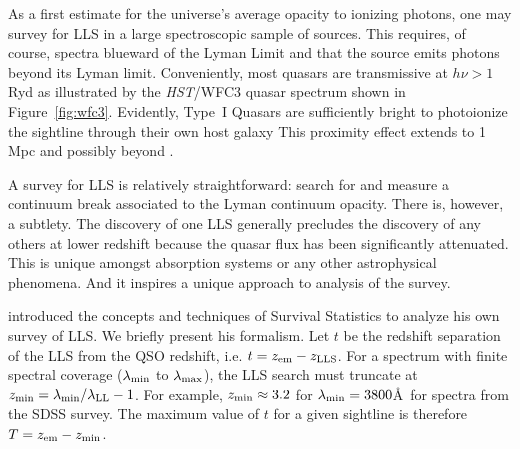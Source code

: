 \documentclass[graybox]{svmult}
\begin{document}
As a first estimate for the universe's average opacity to ionizing
photons, one may survey for LLS in a large spectroscopic
sample of sources.  This requires, of course, 
spectra blueward of the Lyman Limit and that the source
emits photons beyond its Lyman limit.
Conveniently, most quasars are transmissive at $h\nu > 1$\,Ryd
as illustrated by the {\it HST}/WFC3 quasar spectrum
shown in Figure~\ref{fig:wfc3}.
Evidently, Type~I Quasars are sufficiently bright to photoionize
the sightline through their own host galaxy
This proximity effect extends to 1\,Mpc and possibly
beyond \cite[]{qpq6}.

A survey for LLS is relatively straightforward:
search for and measure a continuum break associated to the
Lyman continuum opacity.  There is, however, a subtlety.
The discovery of one LLS generally precludes the discovery
of any others at lower redshift because the
quasar flux has been significantly attenuated.
This is unique amongst absorption systems or any other
astrophysical phenomena.  And it inspires a unique approach
to analysis of the survey.

\cite{tytler82} introduced the concepts and techniques of 
Survival Statistics to analyze his own survey of LLS.  We
briefly present his formalism.
Let $t$ be the redshift separation of the LLS
from the QSO redshift, i.e. $t = z_{\rm em} - z_{\rm LLS}$.
For a spectrum with finite spectral coverage 
($\lambda_{\rm min}$ to $\lambda_{\rm max}$), 
the LLS search must truncate 
at $z_{\rm min} = \lambda_{\rm min}/\lambda_{\rm LL} - 1$.
For example, $z_{\rm min} \approx 3.2$ for $\lambda_{\rm min} = 3800$\AA\
for spectra from the SDSS survey.
The maximum value of $t$ for a given sightline
is therefore $T = z_{\rm em} - z_{\rm min}$.
\end{document}
